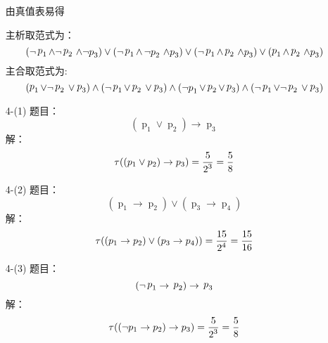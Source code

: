 \documentclass[11pt,oneside,a4paper]{article}
\begin{document}
\begin{itemize}
        \par
        由真值表易得\par
        主析取范式为：
        \[(\neg \mathop p\nolimits_1  \wedge {\rm{ }}\neg \mathop p\nolimits_2 {\rm{ }}\mathop { \wedge \neg p}\nolimits_3 ) \vee (\neg \mathop p\nolimits_1  \wedge {\rm{ }}\mathop {\neg p}\nolimits_2 {\rm{ }}\mathop { \wedge p}\nolimits_3 ) \vee (\neg \mathop p\nolimits_1  \wedge {\rm{ }}\mathop p\nolimits_2 {\rm{ }}\mathop { \wedge p}\nolimits_3 ) \vee (\mathop p\nolimits_1  \wedge {\rm{ }}\mathop p\nolimits_2 {\rm{ }}\mathop { \wedge p}\nolimits_3 )\]
        主合取范式为:
        \[(\mathop p\nolimits_1  \vee {\rm{ }}\neg \mathop p\nolimits_2 {\rm{ }} \vee \mathop p\nolimits_3 ) \wedge (\neg \mathop p\nolimits_1  \vee {\rm{ }}\mathop p\nolimits_2 {\rm{ }} \vee \mathop p\nolimits_3 ) \wedge (\mathop {\neg p}\nolimits_1  \vee {\rm{ }}\mathop p\nolimits_2  \vee \mathop p\nolimits_3 ) \wedge (\neg \mathop p\nolimits_1  \vee {\rm{ }}\neg \mathop p\nolimits_2 {\rm{ }} \vee \mathop p\nolimits_3 )\]
        \item[4-(1)] 
        题目：\[\left( {\mathop p\nolimits_1  \vee \mathop p\nolimits_2 } \right) \to \mathop p\nolimits_3 \]
        解：\[\tau (\left( {{\rm{ }}{p_1} \vee {\rm{ }}{p_2}} \right) \to {\rm{ }}{p_3}) = \frac{5}{{\mathop 2\nolimits^3 }} = \frac{5}{8}\]
        \item[4-(2)]
        题目：\[\left( {\mathop p\nolimits_1  \to \mathop p\nolimits_2 } \right) \vee \left( {\mathop p\nolimits_3  \to \mathop p\nolimits_4 } \right)\]
        解：\[\tau (\left( {{\rm{ }}{p_1} \to {\rm{ }}{p_2}} \right) \vee \left( {{\rm{ }}{p_3} \to {\rm{ }}{p_4}} \right)) = \frac{{15}}{{\mathop 2\nolimits^4 }} = \frac{{15}}{{16}}\]
        \item[4-(3)]
        题目：\[(\neg \mathop p\nolimits_1  \to {\rm{ }}\mathop p\nolimits_2 ) \to {\rm{ }}\mathop p\nolimits_3 \]
        解： \[\tau ((\neg {\rm{ }}{p_1} \to {\rm{ }}{p_2}) \to {\rm{ }}{p_3}) = \frac{5}{{\mathop 2\nolimits^3 }} = \frac{{5}}{8}\]
    \end{itemize}
\end{document}
